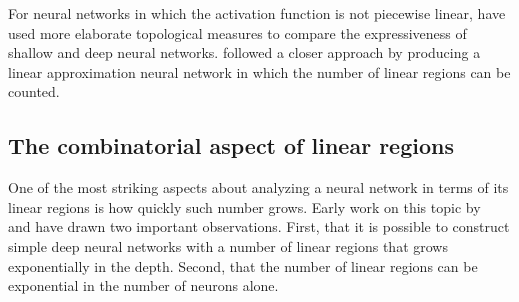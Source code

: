 For neural networks in which the activation function is not piecewise linear, 
\cite{Bianchini2014} have used more elaborate topological measures to compare the expressiveness of shallow and deep neural networks. 
\cite{hu2020curve} followed a closer approach by producing a linear approximation neural network in which the number of linear regions can be counted.



\subsection{The combinatorial aspect of linear regions}

One of the most striking aspects about analyzing a neural network in terms of its linear regions is how quickly such number grows. 
Early work on this topic by~\cite{pascanu2013on} and \cite{montufar2014on} have drawn two important observations.
First, that it is possible to construct simple deep neural networks with a number of linear regions that grows exponentially in the depth.
Second, that the number of linear regions can be exponential in the number of neurons alone. 

